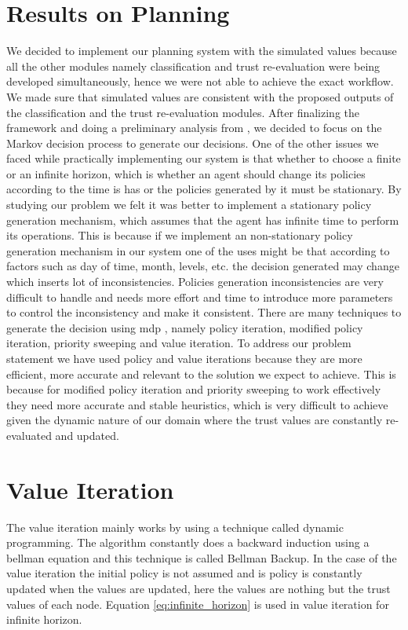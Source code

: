 \section{Results on Planning}
We decided to implement our planning system with the
simulated values because all the other modules namely classification and trust
re-evaluation were being developed simultaneously, hence we were not able to
achieve the exact workflow. We made sure that simulated values are consistent
with the proposed outputs of the classification and the trust re-evaluation
modules. After finalizing the framework and doing a preliminary analysis from
\autocite{Norvig2012}, we decided to focus on the Markov decision process to generate our
decisions.  One of the other issues we faced while practically implementing our
system is that whether to choose a finite or an infinite horizon, which is
whether an agent should change its policies according to the time is has or the
policies generated by it must be stationary. By studying our problem we felt it
was better to implement a stationary policy generation mechanism, which assumes
that the agent has infinite time to perform its operations. This is because if
we implement an non-stationary policy generation mechanism in our system one of
the uses might be that according to factors such as day of time, month, levels,
etc. the decision generated may change which inserts lot of inconsistencies.
Policies generation inconsistencies are very difficult to handle and needs more
effort and time to introduce more parameters to control the inconsistency and
make it consistent.  There are many techniques to generate the decision using
\gls{mdp} \autocite{Wikipedia2013}, namely policy iteration, modified policy iteration, priority sweeping
and value iteration. To address our problem statement we have used policy and
value iterations because they are more efficient, more accurate and relevant to
the solution we expect to achieve. This is because for modified policy iteration
and priority sweeping to work effectively they need more accurate and stable
heuristics, which is very difficult to achieve given the dynamic nature of our
domain where the trust values are constantly re-evaluated and updated. 

\section{Value Iteration}
The value iteration mainly works by using a technique called dynamic
programming. The algorithm constantly does a backward induction using a bellman
equation \autocite{Wikipedia2013} and this technique is called Bellman Backup. In the case of the
value iteration the initial policy is not assumed and is policy is constantly
updated when the values are updated, here the values are nothing but the trust
values of each node.  Equation \ref{eq:infinite_horizon} is used in value iteration for infinite
horizon.

